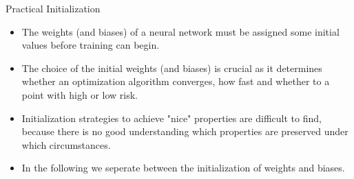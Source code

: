 \documentclass[11pt,compress,t,notes=noshow, xcolor=table]{beamer}
\begin{document}
\begin{vbframe} {Practical Initialization}
  \begin{itemize}
    \item The weights (and biases) of a neural network must be assigned some initial values before training can begin.
    \item The choice of the initial weights (and biases) is crucial as it determines whether an optimization algorithm converges, how fast and whether to a point with high or low risk. 
    \item Initialization strategies to achieve "nice" properties are difficult to find, because there is no good understanding which properties are preserved under which circumstances. 
    \item In the following we seperate between the initialization of weights and biases. 
  \end{itemize}
  \end{vbframe}
  
\end{document}
